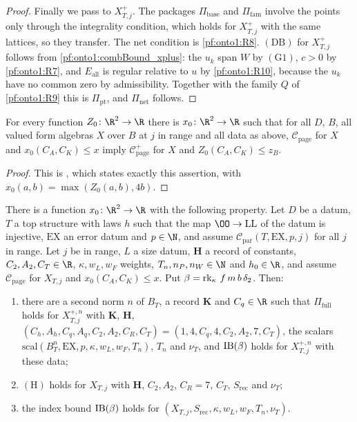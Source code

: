 \begin{proof}
Finally we pass to $X^+_{T,j}$. The packages $\Pi_{\mathrm{base}}$ and $\Pi_{\mathrm{fam}}$ involve the points only through
the integrality condition, which holds for $X^+_{T,j}$ with the same lattices, so they transfer. The net condition is
\ref{pf:onto1:R8}. $(\mathrm{DB})$ for $X^+_{T,j}$ follows from \cref{pf:onto1:combBound_xplus}: the $u_k$ span $W$ by
$(\mathrm G1)$, $c>0$ by \ref{pf:onto1:R7}, and $E_{\mathrm{all}}$ is regular relative to $u$ by \ref{pf:onto1:R10}, because the
$u_k$ have no common zero by admissibility. Together with the family $Q$ of \ref{pf:onto1:R9} this is $\Pi_{\mathrm{pt}}$,
and $\Pi_{\mathrm{net}}$ follows.
\end{proof}

\begin{lemma}\label{pf:onto1:threshold}
For every function $Z_0\colon\R^2\to\R$ there is $x_0\colon\R^2\to\R$ such that for all $D$, $B$, all valued form algebras $X$
over $B$ at $j$ in range and all data as above, $\mathcal C_{\mathrm{page}}$ for $X$ and $x_0(C_A,C_K)\le x$ imply $\mathcal
C^+_{\mathrm{page}}$ for $X$ and $Z_0(C_A,C_K)\le z_B$.
\end{lemma}

\begin{proof}
This is , which states exactly this assertion, with
$x_0(a,b)=\max(Z_0(a,b),4b)$.
\end{proof}

\begin{theorem}\label{pf:onto1:runholds}
There is a function $x_0\colon\R^2\to\R$ with the following property. Let $D$ be a datum, $T$ a top structure with laws $h$
such that the map $\OO\to\mathrm{LL}$ of the datum is injective, $\mathrm{EX}$ an error datum and $p\in\N$, and assume $\mathcal
C_{\mathrm{par}}(T,\mathrm{EX},p,j)$ for all $j$ in range. Let $j$ be in range, $L$ a size datum, $\mathbf H$ a record of
constants, $C_2,A_2,C_T\in\R$, $\kappa,w_L,w_F$ weights, $T_n,n_P,n_W\in\N$ and $h_0\in\R$, and assume $\mathcal
C_{\mathrm{page}}$ for $X_{T,j}$ and $x_0(C_A,C_K)\le x$. Put $\beta=\operatorname{rk}_\kappa\,f\,m\,b\,\delta_2$. Then:
\begin{enumerate}[label=(\alph*)]
\item there are a second norm $n$ of $B_T$, a record $\mathbf K$ and $C_q\in\R$ such that $\Pi_{\mathrm{full}}$ holds for
$X^{+,n}_{T,j}$ with $\mathbf K$, $\mathbf H$, $(C_h,A_h,C_q,A_q,C_2,A_2,C_R,C_T)=(1,4,C_q,4,C_2,A_2,7,C_T)$, the scalars
$\mathrm{scal}(B_T^n,\mathrm{EX},p,\kappa,w_L,w_F,T_n)$, $T_n$ and $\nu_T$, and $\mathrm{IB}(\beta)$ holds for $X^{+,n}_{T,j}$ with
these data;
\item $(\mathrm H)$ holds for $X_{T,j}$ with $\mathbf H$, $C_2,A_2$, $C_R=7$, $C_T$, $S_{\mathrm{rec}}$ and $\nu_T$;
\item the index bound $\mathrm{IB}(\beta)$ holds for $(X_{T,j},S_{\mathrm{rec}},\kappa,w_L,w_F,T_n,\nu_T)$.
\end{enumerate}
\end{theorem}

